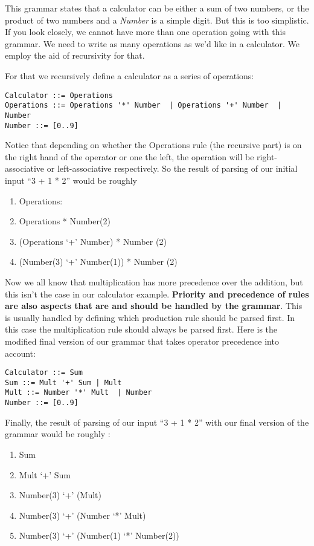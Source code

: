 \documentclass[12pt]{article}
\begin{document}
This grammar states that a calculator can be either a sum of two numbers, or the product of two numbers and a \emph{Number} is a simple digit. But this is too simplistic. If you look closely, we cannot have more than one operation going with this grammar. We need to write as many operations as we’d like in a calculator. We employ the aid of recursivity for that.

For that we recursively define a calculator as a series of operations:

\begin{lstlisting}
Calculator ::= Operations
Operations ::= Operations '*' Number  | Operations '+' Number  | Number
Number ::= [0..9]  
\end{lstlisting}

Notice that depending on whether the Operations rule (the recursive part) is on the right hand of the operator or one the left, the operation will be right-associative or left-associative respectively.
So the result of parsing of our initial input “3 + 1 * 2” would be roughly
\begin{enumerate}
    \item Operations:
    \item Operations * Number(2)
    \item (Operations ‘+’ Number) * Number (2)
    \item (Number(3) ‘+’ Number(1))  * Number (2)
\end{enumerate}

Now we all know that multiplication has more precedence over the addition, but this isn’t the case in our calculator example. \textbf{Priority and precedence of rules are also aspects that are and should be handled by the grammar}. This is usually handled by defining which production rule should be parsed first. In this case the multiplication rule should always be parsed first. Here is the modified final version of our grammar that takes operator precedence into account:

\begin{lstlisting}
Calculator ::= Sum
Sum ::= Mult '+' Sum | Mult
Mult ::= Number '*' Mult  | Number
Number ::= [0..9]
\end{lstlisting}

Finally, the result of parsing of our input “3 + 1 * 2”  with our final version of the grammar would be roughly :
\begin{enumerate}
    \item Sum
    \item Mult ‘+’ Sum
    \item Number(3) ‘+’ (Mult)
    \item Number(3) ‘+’ (Number ‘*’ Mult)
    \item Number(3) ‘+’ (Number(1) ‘*’ Number(2))
\end{enumerate}
\end{document}
